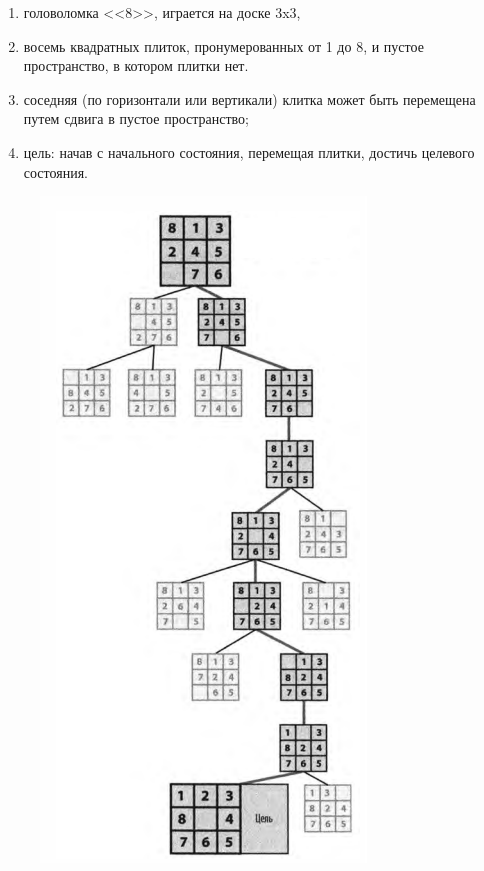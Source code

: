 \documentclass{beamer}
\begin{document}
\begin{frame}
\begin{minipage}{0.5\textwidth}
\begin{flushleft}
\begin{enumerate}
\item головоломка <<8>>, играется на доске 3x3, 
\item восемь квадратных плиток, пронумерованных от 1 до 8, и пустое пространство, в котором плитки нет. 
\item соседняя (по горизонтали или вертикали) клитка может быть перемещена путем сдвига в пустое пространство; 
\item цель: начав с начального состояния, перемещая плитки, достичь целевого состояния.
\end{enumerate}
\end{flushleft}
\end{minipage}
\begin{minipage}{0.3\textwidth}
\begin{flushright}
\begin{figure}[h]
\includegraphics[scale=0.5]{images/lec06-pic01.png}
\end{figure}
\end{flushright}
\end{minipage}
\end{frame}
\end{document}
